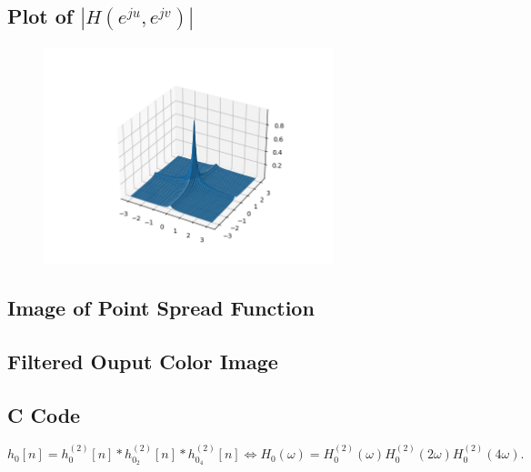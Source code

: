 \documentclass{article}
\begin{document}
\subsection{Plot of $|H(e^{ju}, e^{jv})|$}
\begin{figure}[H]
    \centering
    \includegraphics[width=0.75\textwidth]{../results/section5-python.png}
    \begin{center}
    \end{center}
    \label{fig:A1}
\end{figure}
\subsection{Image of Point Spread Function}
\subsection{Filtered Ouput Color Image}
\subsection{C Code}
\begin{equation*}
    h_0[n] = h_{0}^{(2)}[n] \ast h_{0_2}^{(2)}[n] \ast h_{0_4}^{(2)}[n] \iff H_0(\omega) = H_0^{(2)}(\omega)H_0^{(2)}(2\omega)H_0^{(2)}(4\omega).
\end{equation*}
\end{document}
